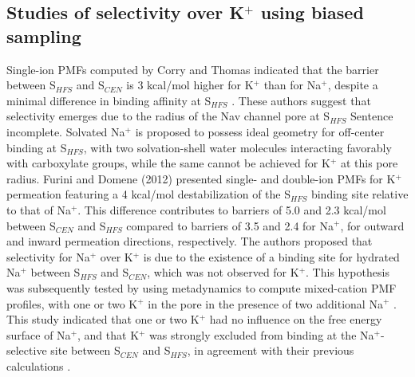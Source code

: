 \begin{refsection}
 \subsection{Studies of selectivity over K$^{+}$ using biased sampling}
 Single-ion PMFs computed by Corry and Thomas indicated that the barrier between S$_{HFS}$ and S$_{CEN}$ is 3 kcal/mol higher for K$^{+}$ than for Na$^{+}$, despite a minimal difference in binding affinity at S$_{HFS}$ \cite{Corry:2012ge}.  These authors suggest that selectivity emerges due to the radius of the Nav channel pore at S$_{HFS}$  Sentence incomplete.  Solvated Na$^{+}$ is proposed to possess ideal geometry for off-center binding at S$_{HFS}$, with two solvation-shell water molecules interacting favorably with carboxylate groups, while the same cannot be achieved for K$^{+}$ at this pore radius.
Furini and Domene (2012) presented single- and double-ion PMFs for K$^{+}$ permeation featuring a 4 kcal/mol destabilization of the S$_{HFS}$ binding site relative to that of Na$^{+}$.  This difference contributes to barriers of 5.0 and 2.3 kcal/mol between S$_{CEN}$ and S$_{HFS}$ compared to barriers of 3.5 and 2.4 for Na$^{+}$, for outward and inward permeation directions, respectively. The authors proposed that selectivity for Na$^{+}$ over K$^{+}$ is due to the existence of a binding site for hydrated Na$^{+}$ between S$_{HFS}$ and S$_{CEN}$, which was not observed for K$^{+}$.  This hypothesis was subsequently tested by using metadynamics to compute mixed-cation PMF profiles, with one or two K$^{+}$ in the pore in the presence of two additional Na$^{+}$ \cite{Domene:2015kj}.  This study indicated that one or two K$^{+}$ had no influence on the free energy surface of Na$^{+}$, and that K$^{+}$ was strongly excluded from binding at the Na$^{+}$-selective site between S$_{CEN}$ and S$_{HFS}$, in agreement with their previous calculations \cite{Furini:2012jl}.

\end{refsection}
